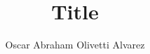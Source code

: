 \documentclass[letterpaper, twoside, table, justified,
               nofonts, nobib, nohyper]{tufte-book}
\title{Title}
\author[Oscar Abraham Olivetti Alvarez]{Oscar Abraham Olivetti Alvarez}
\begin{document}

\frontmatter

\maketitle

\setcounter{chapter}{-1}  %
\setcounter{secnumdepth}{3}
\setcounter{tocdepth}{3}


\begin{fullwidth}
    \tableofcontents
\end{fullwidth}






\mainmatter













\backmatter




\begin{fullwidth}
    \printindex
\end{fullwidth}


\end{document}
